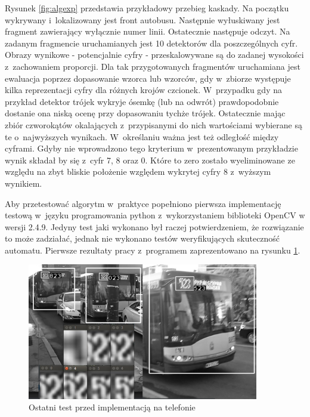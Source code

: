Rysunek \ref{fig:algexp} przedstawia przykładowy przebieg kaskady. 
Na początku wykrywany i~lokalizowany jest front autobusu.
Następnie wyłuskiwany jest fragment zawierający wyłącznie numer linii.
Ostatecznie następuje odczyt. Na zadanym fragmencie uruchamianych jest
10 detektorów dla poszczególnych cyfr. Obrazy wynikowe - potencjalnie
cyfry - przeskalowywane są do zadanej wysokości z~zachowaniem proporcji.
Dla tak przygotowanych fragmentów uruchamiana jest ewaluacja poprzez
dopasowanie wzorca lub wzorców, gdy w~zbiorze występuje kilka
reprezentacji cyfry dla różnych krojów czcionek. W~przypadku
gdy na przykład detektor trójek
wykryje ósemkę (lub na odwrót) prawdopodobnie dostanie ona niską
ocenę przy dopasowaniu tychże trójek. Ostatecznie mając
zbiór czworokątów okalających z~przypisanymi do nich wartościami
wybierane są te o~najwyższych wynikach. W~określaniu ważna jest też
odległość między cyframi. Gdyby nie wprowadzono tego kryterium
w~prezentowanym przykładzie wynik składał by się z~cyfr 7, 8 oraz 0.
Które to zero zostało wyeliminowane ze względu na zbyt bliskie położenie
względem wykrytej cyfry 8 z~wyższym wynikiem.

Aby przetestować algorytm w~praktyce
popełniono pierwsza implementację testową w~języku programowania
python z~wykorzystaniem biblioteki OpenCV w wersji 2.4.9.
Jedyny test jaki wykonano był raczej potwierdzeniem, że
rozwiązanie to może zadziałać, jednak nie wykonano testów
weryfikujących skuteczność automatu. Pierwsze rezultaty
pracy z~programem zaprezentowano na rysunku \ref{fig:finaltest}.

\begin{figure}[!h]
    \centering
    \includegraphics[width=0.9\textwidth]{img/exp_final_test}
    \caption{Ostatni test przed implementacją na telefonie}
    \label{fig:finaltest}
\end{figure}


